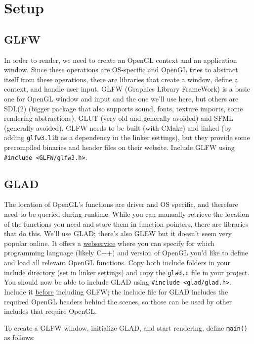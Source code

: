 \documentclass[table, xcdraw]{article}%
\begin{document}
\section{Setup}

\subsection{GLFW}

In order to render, we need to create an OpenGL context and an application window. Since these operations are OS-specific and OpenGL tries to abstract itself from these operations, there are libraries that create a window, define a context, and handle user input. GLFW (Graphics Library FrameWork) is a basic one for OpenGL window and input and the one we'll use here, but others are SDL(2) (bigger package that also supports sound, fonts, texture imports, some rendering abstractions), GLUT (very old and generally avoided) and SFML (generally avoided). GLFW needs to be built (with CMake) and linked (by adding \texttt{glfw3.lib} as a dependency in the linker settings), but they provide some precompiled binaries and header files on their website. Include GLFW using \texttt{#include <GLFW/glfw3.h>}.

\subsection{GLAD}

The location of OpenGL's functions are driver and OS specific, and therefore need to be queried during runtime. While you can manually retrieve the location of the functions you need and store them in function pointers, there are libraries that do this. We'll use GLAD; there's also GLEW but it doesn't seem very popular online. It offers a \href{https://glad.dav1d.de}{webservice} where you can specify for which programming language (likely C++) and version of OpenGL you'd like to define and load all relevant OpenGL functions. Copy both include folders in your include directory (set in linker settings) and copy the \texttt{glad.c} file in your project. You should now be able to include GLAD using \texttt{#include <glad/glad.h>}. Include it \underline{before} including GLFW; the include file for GLAD includes the required OpenGL headers behind the scenes, so those can be used by other includes that require OpenGL.

To create a GLFW window, initialize GLAD, and start rendering, define \texttt{main()} as follows:
\end{document}
